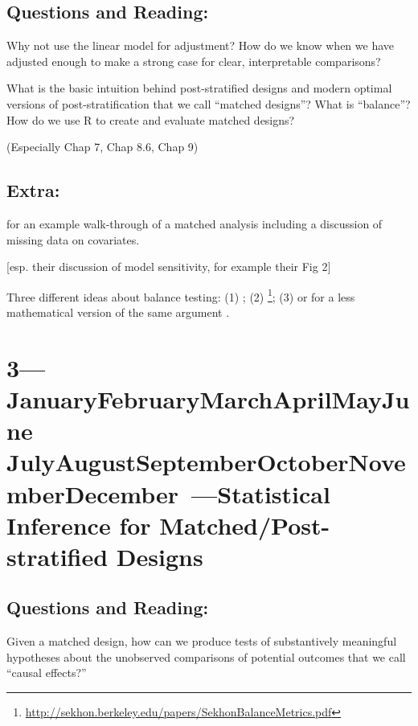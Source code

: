 \documentclass[10pt, letterpaper]{article}
\def\themonth{\ifcase\month\or
  January\or February\or March\or April\or May\or June\or
  July\or August\or September\or October\or November\or December\fi}
\begin{document}
\subsection{Questions and Reading:}

Why not use the linear model for adjustment? How do we know when we have
adjusted enough to make a strong case for clear, interpretable comparisons?

\citealp[Chap 6]{rosenbaum2010design}

\citealp[Chap 9.5--9.6]{gelman2007dau}

What is the basic intuition behind post-stratified designs and modern optimal
versions of post-stratification that we call ``matched designs''? What is
``balance''? How do we use R to create and evaluate matched designs?

\citealp[Chap 7--9, 13]{rosenbaum2010design} (Especially Chap 7, Chap 8.6,
Chap 9)

\subsection{Extra:}

\citealp[Chap 3]{rosenbaum2010design} 

\cite{hansen:2004a}

\cite{hansen2011qy} for an example walk-through of a matched analysis
including a discussion of missing data on covariates.

\cite{ho2007man} [esp. their discussion of model sensitivity, for
example their Fig 2]

Three different ideas about balance testing: (1) \cite{imai2008mae}; (2)
\cite{sekhon2007alternative}\footnote{
  \url{http://sekhon.berkeley.edu/papers/SekhonBalanceMetrics.pdf}}; (3)
\cite{hansen2008cbs} \cite{hansen:statmed:2008} or for a less mathematical
version of the same argument \cite[\S 3]{bowers2011mem}.



\AdvanceDate[1]
\section{3---\themonth~\the\day---Statistical Inference for Matched/Post-stratified Designs}


\subsection{Questions and Reading:}

Given a matched design, how can we produce tests of substantively meaningful
hypotheses about the unobserved comparisons of potential outcomes that we call
``causal effects?''
\end{document}

